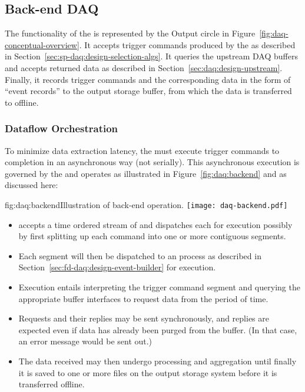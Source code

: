 \subsection{Back-end DAQ}
\label{sec:fd-daq:design-backend}

The functionality of the  is represented by the Output circle in Figure~\ref{fig:daq-conceptual-overview}. 
It accepts trigger commands produced by the  as described in Section~\ref{sec:sp-daq:design-selection-algs}. 
It queries the upstream DAQ buffers and accepts returned data as described in Section~\ref{sec:daq:design-upstream}. 
Finally, it records trigger commands and the corresponding data in the
form of ``event records'' to the output storage buffer, from which the data is transferred to offline.

\subsubsection{Dataflow Orchestration}

To minimize data extraction latency, the  must execute
trigger commands to completion in an asynchronous way (not serially). 
This asynchronous execution is governed by the  and operates as illustrated in Figure~\ref{fig:daq:backend} and as discussed here:

\begin{dunefigure}{fig:daq:backend}{Illustration of   back-end operation.}
  \texttt{[image: daq-backend.pdf]}
\end{dunefigure}

\begin{itemize}
\item {} accepts a time ordered stream of  and dispatches each for execution possibly by first splitting up each command into one or more contiguous segments.
\item Each segment will then be dispatched to an  process as described in Section~\ref{sec:fd-daq:design-event-builder} for execution.
\item Execution entails interpreting the trigger command segment and querying the appropriate  buffer interfaces to request data from the period of time. 
\item Requests and their replies may be sent synchronously, and
  replies are expected even if data has already been purged from the
   buffer. (In that case, an error message would be sent out.)
\item The data received may then undergo processing and aggregation
  until finally it is saved to one or more files on the output storage
  system before it is transferred offline.
\end{itemize}



